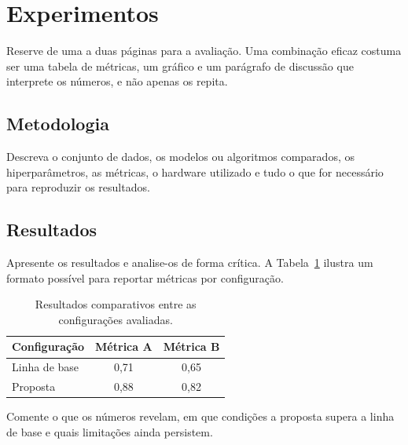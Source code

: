 \section{Experimentos}
\label{sec:experimentos}

Reserve de uma a duas páginas para a avaliação. Uma combinação eficaz costuma
ser uma tabela de métricas, um gráfico e um parágrafo de discussão que
interprete os números, e não apenas os repita.

\subsection{Metodologia}
\label{sec:experimentos:metodologia}

Descreva o conjunto de dados, os modelos ou algoritmos comparados, os
hiperparâmetros, as métricas, o hardware utilizado e tudo o que for necessário
para reproduzir os resultados.

\subsection{Resultados}
\label{sec:experimentos:resultados}

Apresente os resultados e analise-os de forma crítica. A Tabela~\ref{tab:resultados}
ilustra um formato possível para reportar métricas por configuração.

\begin{table}[H]
  \centering
  \caption{Resultados comparativos entre as configurações avaliadas.}
  \label{tab:resultados}
  \begin{tabular}{lcc}
    \toprule
    Configuração & Métrica A & Métrica B \\
    \midrule
    Linha de base   & 0{,}71 & 0{,}65 \\
    Proposta        & 0{,}88 & 0{,}82 \\
    \bottomrule
  \end{tabular}
\end{table}

Comente o que os números revelam, em que condições a proposta supera a linha de
base e quais limitações ainda persistem.
